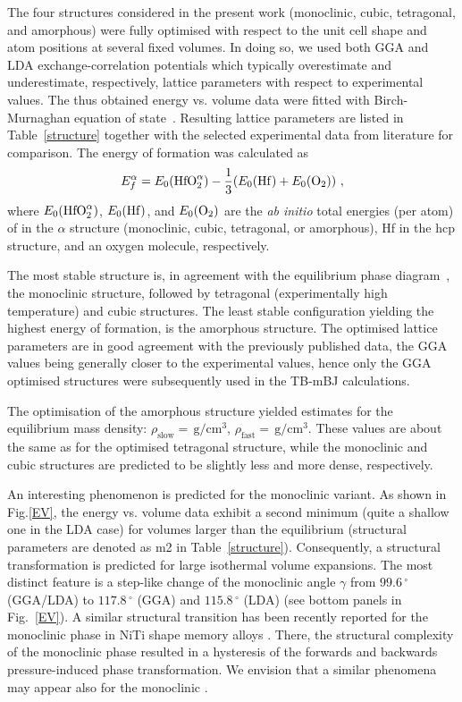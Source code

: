 \documentclass[10pt,a4paper,twocolumn]{article}
\begin{document}
The four structures considered in the present work (monoclinic, cubic, tetragonal, and amorphous) were fully optimised with respect to the unit cell shape and atom positions at several fixed volumes.
In doing so, we used both GGA and LDA exchange-correlation potentials which typically overestimate and underestimate, respectively, lattice parameters with respect to experimental values.
The thus obtained energy vs. volume data were fitted with Birch-Murnaghan equation of state~\cite{Birch1947}.
Resulting lattice parameters are listed in Table~\ref{structure} together with the selected experimental data from literature for comparison.
The energy of formation was calculated as
\begin{equation}
  E_f^\alpha=E_0(\ce{HfO2}^\alpha) - \frac13 (E_0(\ce{Hf}) + E_0(\ce{O2}))\ ,
\end{equation}
where $E_0(\ce{HfO2}^\alpha)$, $E_0(\ce{Hf})$, and $E_0(\ce{O2})$ are the \textit{ab initio} total energies (per atom) of  in the $\alpha$ structure (monoclinic, cubic, tetragonal, or amorphous), Hf in the hcp structure, and an oxygen molecule, respectively.

The most stable structure is, in agreement with the equilibrium phase diagram~\cite{Villars2014-px}, the monoclinic structure, followed by tetragonal (experimentally high temperature) and cubic structures.
The least stable configuration yielding the highest energy of formation, is the amorphous structure.
The optimised lattice parameters are in good agreement with the previously published data, the GGA values being generally closer to the experimental values, hence only the GGA optimised structures were subsequently used in the TB-mBJ calculations.

The optimisation of the amorphous structure yielded estimates for the equilibrium mass density: $\rho_{\mathrm{slow}}=\,\mathrm{g/cm^3}$, $\rho_{\mathrm{fast}}=\,\mathrm{g/cm^3}$. %
These values are about the same as for the optimised tetragonal structure, while the monoclinic and cubic structures are predicted to be slightly less and more dense, respectively.

An interesting phenomenon is predicted for the monoclinic variant.
As shown in Fig.\ref{EV}, the energy vs. volume data exhibit a second minimum (quite a shallow one in the LDA case) for volumes larger than the equilibrium (structural parameters are denoted as m2 in Table~\ref{structure}).
Consequently, a structural transformation is predicted for large isothermal volume expansions.
The most distinct feature is a step-like change of the monoclinic angle $\gamma$ from $99.6\,^\circ$ (GGA/LDA) to $117.8\,^\circ$ (GGA) and $115.8\,^\circ$ (LDA) (see bottom panels in Fig.~\ref{EV}).
A similar structural transition has been recently reported for the monoclinic phase in NiTi shape memory alloys \cite{Holec2011-tg}.
There, the structural complexity of the monoclinic phase resulted in a hysteresis of the forwards and backwards pressure-induced phase transformation.
We envision that a similar phenomena may appear also for the monoclinic .
\end{document}
